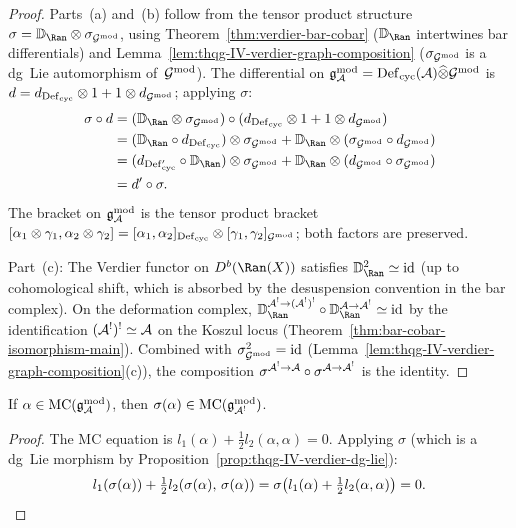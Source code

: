 \begin{proof}
Parts~(a) and~(b) follow from the tensor product structure
$\sigma = \VD_{\Ran} \otimes \sigma_{\Gmod}$, using
Theorem~\ref{thm:verdier-bar-cobar}
($\VD_{\Ran}$ intertwines bar differentials) and
Lemma~\ref{lem:thqg-IV-verdier-graph-composition}
($\sigma_{\mathcal{G}^{\mathrm{mod}}}$ is a dg~Lie automorphism of~$\mathcal{G}^{\mathrm{mod}}$).
The differential on $\mathfrak{g}_{\mathcal{A}}^{\mathrm{mod}} = \mathrm{Def}_{\mathrm{cyc}}(\mathcal{A}) \widehat{\otimes} \mathcal{G}^{\mathrm{mod}}$
is $d = d_{\mathrm{Def}_{\mathrm{cyc}}} \otimes 1 + 1 \otimes d_{\mathcal{G}^{\mathrm{mod}}}$; applying
$\sigma$:
\begin{align*}
\sigma \circ d
&= (\VD_{\Ran} \otimes \sigma_{\Gmod}) \circ
 (d_{\Defcyc} \otimes 1 + 1 \otimes d_{\Gmod}) \\
&= (\VD_{\Ran} \circ d_{\Defcyc}) \otimes \sigma_{\Gmod}
 + \VD_{\Ran} \otimes (\sigma_{\Gmod} \circ d_{\Gmod}) \\
&= (d_{\Defcyc'} \circ \VD_{\Ran}) \otimes \sigma_{\Gmod}
 + \VD_{\Ran} \otimes (d_{\Gmod} \circ \sigma_{\Gmod}) \\
&= d' \circ \sigma.
\end{align*}
The bracket on $\mathfrak{g}_{\mathcal{A}}^{\mathrm{mod}}$ is the tensor product bracket
$[\alpha_1 \otimes \gamma_1, \alpha_2 \otimes \gamma_2]
= [\alpha_1, \alpha_2]_{\mathrm{Def}_{\mathrm{cyc}}} \otimes [\gamma_1, \gamma_2]_{\mathcal{G}^{\mathrm{mod}}}$;
both factors are preserved.

Part~(c): The Verdier functor on $D^b(\Ran(X))$ satisfies
$\VD_{\Ran}^2 \simeq \id$ (up to cohomological shift, which is absorbed
by the desuspension convention in the bar complex). On the deformation
complex, $\VD_{\Ran}^{\cA^! \to (\cA^!)^!} \circ \VD_{\Ran}^{\cA \to \cA^!}
\simeq \id$ by the identification $(\mathcal{A}^!)^! \simeq \mathcal{A}$ on the Koszul locus
(Theorem~\ref{thm:bar-cobar-isomorphism-main}). Combined with
$\sigma_{\mathcal{G}^{\mathrm{mod}}}^2 = \mathrm{id}$ (Lemma~\ref{lem:thqg-IV-verdier-graph-composition}(c)),
the composition
$\sigma^{\mathcal{A}^! \to \mathcal{A}} \circ \sigma^{\mathcal{A} \to \mathcal{A}^!}$ is the identity.
\end{proof}

\begin{corollary}
\label{cor:thqg-IV-verdier-mc}
If $\alpha \in \mathrm{MC}(\mathfrak{g}_{\mathcal{A}}^{\mathrm{mod}})$, then
$\sigma(\alpha) \in
\mathrm{MC}(\mathfrak{g}_{\mathcal{A}^!}^{\mathrm{mod}})$.
\end{corollary}

\begin{proof}
The MC equation is $l_1(\alpha) + \tfrac{1}{2} l_2(\alpha, \alpha) = 0$.
Applying $\sigma$
(which is a dg~Lie morphism by
Proposition~\ref{prop:thqg-IV-verdier-dg-lie}):
\[
l_1(\sigma(\alpha))
+ \tfrac{1}{2} l_2(\sigma(\alpha),\,
\sigma(\alpha))
= \sigma
\bigl(l_1(\alpha) + \tfrac{1}{2} l_2(\alpha, \alpha)\bigr)
= 0.
\qedhere
\]
\end{proof}

